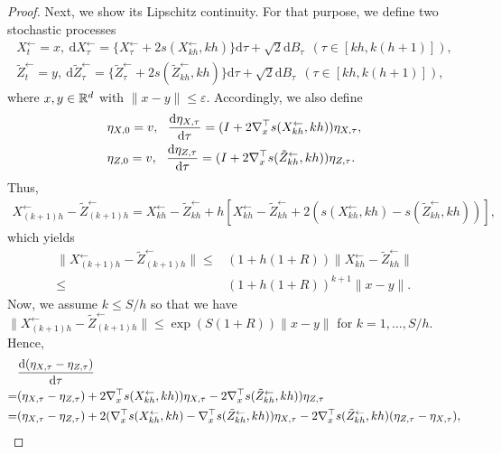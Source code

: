 \begin{proof}
Next, we show its Lipschitz continuity. 
For that purpose, we define two stochastic processes 
\begin{align}
{X}_{t}^\leftarrow=x,\ \mathrm{d}{X}_{\tau}^\leftarrow = \{{X}_{\tau}^\leftarrow + 2s({X}_{kh}^\leftarrow,kh)\}\mathrm{d}\tau + \sqrt{2}\mathrm{d}B_\tau~~(\tau \in [kh,k(h+1)]), \\
\tilde{Z}_{t}^\leftarrow=y,\ \mathrm{d}\tilde{Z}_{\tau}^\leftarrow = \{\tilde{Z}_{\tau}^\leftarrow + 2s(\tilde{Z}_{kh}^\leftarrow,kh)\}\mathrm{d}\tau + \sqrt{2}\mathrm{d}B_\tau~~(\tau \in [kh,k(h+1)]),
\end{align}
where $x,y \in {\mathbb{R}}^d$ with $\|x - y\| \leq \varepsilon$.
Accordingly, we also define 
\begin{align}
& \eta_{{X},0} = v,~~\frac{{\textnormal{d}} \eta_{{X},\tau}}{{\textnormal{d}} \tau}  = (I + 2 \nabla_x^\top s({X}_{kh}^\leftarrow,kh)) \eta_{{X},\tau},  \\
&  \eta_{Z,0} = v,~~\frac{{\textnormal{d}} \eta_{Z,\tau}}{{\textnormal{d}} \tau}  = (I + 2 \nabla_x^\top s(\tilde{Z}_{kh}^\leftarrow,kh)) \eta_{Z,\tau}.
\end{align} 
Thus, 
\begin{align}
{X}_{(k+1)h}^\leftarrow - \tilde{Z}_{(k+1)h}^\leftarrow
= 
{X}_{kh}^\leftarrow - \tilde{Z}_{k h}^\leftarrow
+ h [{X}_{kh}^\leftarrow - \tilde{Z}_{k h}^\leftarrow + 2(s({X}_{kh}^\leftarrow,kh) - s(\tilde{Z}_{kh}^\leftarrow,kh))],
\end{align}
which yields 
\begin{align}
\|{X}_{(k+1)h}^\leftarrow - \tilde{Z}_{(k+1)h}^\leftarrow\| 
\leq & 
(1 + h(1 + R)) \|{X}_{kh}^\leftarrow - \tilde{Z}_{k h}^\leftarrow\| \\
\leq & 
(1 + h(1 + R))^{k+1} \|x - y\|.
\end{align}
Now, we assume $k \leq S/h$ so that we have 
$\|{X}_{(k+1)h}^\leftarrow - \tilde{Z}_{(k+1)h}^\leftarrow\| 
\leq \exp(S(1+R)) \|x - y\|$ for $k=1,\dots,S/h$. 
Hence, 
\begin{align}
& \frac{{\textnormal{d}} (\eta_{{X},\tau} - \eta_{Z,\tau})}{{\textnormal{d}} \tau}  \\
=& ( \eta_{{X},\tau} -  \eta_{Z,\tau}) + 
2 \nabla_x^\top s({X}_{kh}^\leftarrow,kh)) \eta_{{X},\tau} - 2 \nabla_x^\top s(\tilde{Z}_{kh}^\leftarrow,kh)) \eta_{Z,\tau} \\
=& ( \eta_{{X},\tau} -  \eta_{Z,\tau}) + 
2 (\nabla_x^\top s({X}_{kh}^\leftarrow,kh) - \nabla_x^\top s(\tilde{Z}_{kh}^\leftarrow,kh)) 
\eta_{{X},\tau} - 
2 \nabla_x^\top s(\tilde{Z}_{kh}^\leftarrow,kh)(\eta_{Z,\tau} -  \eta_{{X},\tau}),
\end{align} 

\end{proof}
